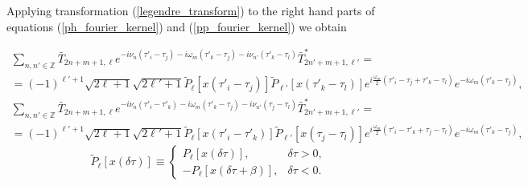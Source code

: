 \documentclass[a4paper,12pt]{article}
\renewcommand{\t}{\ensuremath{\tau}}
\newcommand{\w}{\ensuremath{\omega}}
\begin{document}
Applying transformation (\ref{legendre_transform}) to the right hand parts of
equations (\ref{ph_fourier_kernel}) and (\ref{pp_fourier_kernel}) we obtain

\begin{multline}
	\sum_{n,n'\in\mathbb{Z}}
	\bar T_{2n+m+1,\ell}
	e^{-i\nu_n(\t'_i-\t_j) -i\w_m(\t'_k-\t_j) -i\nu_{n'}(\t'_k-\t_l)}
	\bar T^*_{2n'+m+1,\ell'} =\\=
	(-1)^{\ell'+1}\sqrt{2\ell+1}\sqrt{2\ell'+1}
	\tilde P_\ell[x(\t'_i-\t_j)] \tilde P_{\ell'}[x(\t'_k-\t_l)]
	e^{i\frac{\w_m}{2}(\t'_i-\t_j+\t'_k-\t_l)} e^{-i\w_m(\t'_k-\t_j)},
\end{multline}
\begin{multline}
	\sum_{n,n'\in\mathbb{Z}}
	\bar T_{2n+m+1,\ell}
	e^{-i\nu_n(\t'_i-\t'_k) -i\w_m(\t'_k-\t_j) -i\nu_{n'}(\t_j-\t_l)}
	\bar T^*_{2n'+m+1,\ell'} =\\=
	(-1)^{\ell'+1}\sqrt{2\ell+1}\sqrt{2\ell'+1}
	\tilde P_\ell[x(\t'_i-\t'_k)] \tilde P_{\ell'}[x(\t_j-\t_l)]
	e^{i\frac{\w_m}{2}(\t'_i-\t'_k+\t_j-\t_l)} e^{-i\w_m(\t'_k-\t_j)},
\end{multline}
\begin{equation}
	\tilde P_\ell[x(\delta\t)] \equiv \left\{
	\begin{array}{ll}
	P_\ell[x(\delta\t)], &\delta\t>0,\\
	-P_\ell[x(\delta\t+\beta)], &\delta\t<0.
	\end{array}
	\right.
\end{equation}
\end{document}
